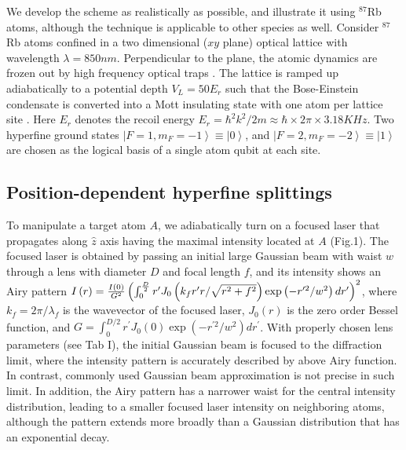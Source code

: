 \documentclass[pra,aps,showpacs,twocolumn]{revtex4}
\begin{document}
We develop the scheme as realistically as possible, and illustrate it using $%
^{87}$Rb atoms, although the technique is applicable to other species as
well. Consider $^{87}$Rb atoms confined in a two dimensional ($xy$ plane)
optical lattice with wavelength $\lambda =850nm$. Perpendicular to the
plane, the atomic dynamics are frozen out by high frequency optical traps 
\cite{Raizen}. The lattice is ramped up adiabatically to a potential depth $%
V_{L}=50E_{r}$ such that the Bose-Einstein condensate is converted into a
Mott insulating state with one atom per lattice site \cite{Greiner}. Here $%
E_{r}$ denotes the recoil energy $E_{r}=\hbar ^{2}k^{2}/2m\approx \hbar
\times 2\pi \times 3.18KHz$. Two hyperfine ground states $\left\vert
F=1,m_{F}=-1\right\rangle \equiv \left\vert 0\right\rangle $, and $%
\left\vert F=2,m_{F}=-2\right\rangle \equiv \left\vert 1\right\rangle $ are
chosen as the logical basis of a single atom qubit at each site.

\subsection{Position-dependent hyperfine splittings}

To manipulate a target atom $A$, we adiabatically turn on a focused laser
that propagates along $\hat{z}$ axis having the maximal intensity located at 
$A$ (Fig.1). The focused laser is obtained by passing an initial large
Gaussian beam with waist $w$ through a lens with diameter $D$ and focal
length $f$, and its intensity shows an Airy pattern $I\left( r\right) =\frac{%
I\left( 0\right) }{G^{2}}\left( \int_{0}^{\frac{D}{2}}r^{\prime }J_{0}\left(
k_{f}r^{\prime }r/\sqrt{r^{2}+f^{2}}\right) \exp \left( -r^{\prime
2}/w^{2}\right) dr^{\prime }\right) ^{2}$, where $k_{f}=2\pi /\lambda _{f}$
is the wavevector of the focused laser, $J_{0}\left( r\right) $ is the zero
order Bessel function, and $G=\int_{0}^{D/2}r^{\prime }J_{0}\left( 0\right)
\exp \left( -r^{\prime 2}/w^{2}\right) dr^{\prime }$. With properly chosen
lens parameters (see Tab I), the initial Gaussian beam is focused to the
diffraction limit, where the intensity pattern is accurately described by
above Airy function. In contrast, commonly used Gaussian beam approximation
is not precise in such limit. In addition, the Airy pattern has a narrower
waist for the central intensity distribution, leading to a smaller focused
laser intensity on neighboring atoms, although the pattern extends more
broadly than a Gaussian distribution that has an exponential decay.
\end{document}
